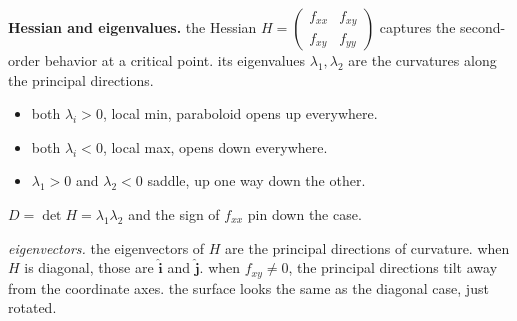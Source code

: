 \documentclass[12pt]{article}
\theoremstyle{compact}
\newcommand{\ihat}{\hat{\mathbf{i}}}
\newcommand{\jhat}{\hat{\mathbf{j}}}
\begin{document}
\medskip\textbf{Hessian and eigenvalues.} the Hessian $H = \begin{pmatrix} f_{xx} & f_{xy} \\ f_{xy} & f_{yy} \end{pmatrix}$ captures the second-order behavior at a critical point. its eigenvalues $\lambda_1,\lambda_2$ are the curvatures along the principal directions.
\begin{itemize}[noitemsep]
\item both $\lambda_i > 0$, local min, paraboloid opens up everywhere.
\item both $\lambda_i < 0$, local max, opens down everywhere.
\item $\lambda_1>0$ and $\lambda_2<0$ saddle, up one way down the other.
\end{itemize}
$D=\det H=\lambda_1\lambda_2$ and the sign of $f_{xx}$ pin down the case.

\textit{eigenvectors.} the eigenvectors of $H$ are the principal directions of curvature. when $H$ is diagonal, those are $\ihat$ and $\jhat$. when $f_{xy}\ne 0$, the principal directions tilt away from the coordinate axes. the surface looks the same as the diagonal case, just rotated.
\end{document}
